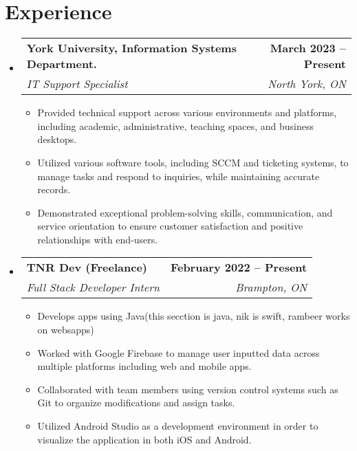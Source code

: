 \documentclass[letterpaper,11pt]{article}
\makeatletter
\newcommand{\resumeItem}[1]{
  \item\small{
    {#1 \vspace{-2pt}}
  }
}
\newcommand{\resumeSubheading}[4]{
  \vspace{-2pt}\item
    \begin{tabular*}{1.0\textwidth}[t]{l@{\extracolsep{\fill}}r}
      \textbf{#1} & \textbf{\small #2} \\
      \textit{\small#3} & \textit{\small #4} \\
    \end{tabular*}\vspace{-7pt}
}
\newcommand{\resumeSubHeadingListStart}{\begin{itemize}[leftmargin=0.0in, label={}]}
\newcommand{\resumeSubHeadingListEnd}{\end{itemize}}
\newcommand{\resumeItemListStart}{\begin{itemize}}
\newcommand{\resumeItemListEnd}{\end{itemize}\vspace{-5pt}}
\makeatother
\begin{document}
\section{Experience}
  \resumeSubHeadingListStart

    \resumeSubheading
      {York University, Information Systems Department.}{March 2023 -- Present}
      {IT Support Specialist}{North York, ON}
      \resumeItemListStart
              \resumeItem{Provided technical support across various environments and platforms, including academic, administrative, teaching spaces, and business desktops.}
        \resumeItem{Utilized various software tools, including SCCM and ticketing systems, to manage tasks and respond to inquiries, while maintaining accurate records.}
        \resumeItem{Demonstrated exceptional problem-solving skills, communication, and service orientation to ensure customer satisfaction and positive relationships with end-users.}
      \resumeItemListEnd

    \resumeSubheading
      {TNR Dev (Freelance)}{February 2022 -- Present}
      {Full Stack Developer Intern}{Brampton, ON}
      \resumeItemListStart
        \resumeItem{Develops apps using Java(this secction is java, nik is swift, rambeer works on websapps)}
        \resumeItem{Worked with Google Firebase to manage user inputted data across multiple platforms including web and mobile apps.}
        \resumeItem{Collaborated with team members using version control systems such as Git to organize modifications and assign tasks.}
        \resumeItem{Utilized Android Studio as a development environment in order to visualize the application in both iOS and Android.}
    \resumeItemListEnd
    
  \resumeSubHeadingListEnd
\vspace{-16pt}

\end{document}
